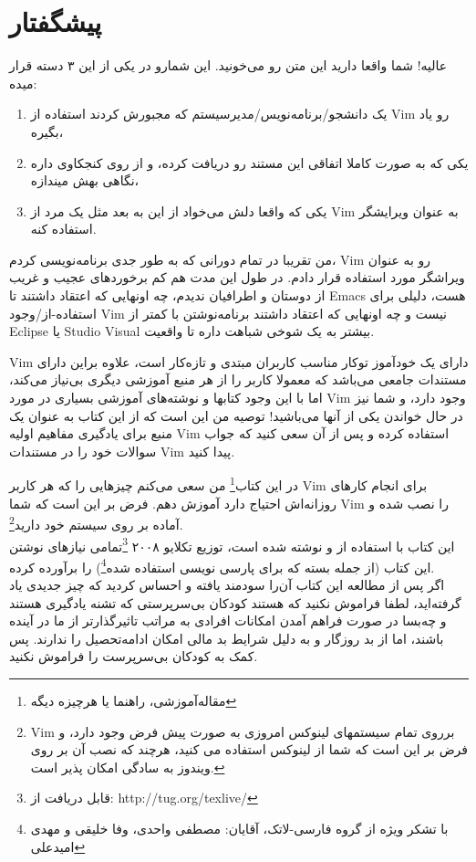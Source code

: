 \chapter{پیشگفتار}
عالیه! شما واقعا دارید این متن رو می‌خونید. این شمارو در یکی از این ۳ دسته قرار میده:
\begin{enumerate}
\item یک دانشجو/برنامه‌نویس/مدیرسیستم که مجبورش کردند استفاده از Vim رو یاد بگیره،
\item یکی که به صورت کاملا اتفاقی این مستند رو دریافت کرده،‌ و از روی کنجکاوی داره نگاهی بهش میندازه،
\item یکی که واقعا دلش می‌خواد از این به بعد مثل یک مرد از Vim به عنوان ویرایشگر استفاده کنه.
\end{enumerate}


من تقریبا در تمام دورانی که به طور جدی برنامه‌نویسی کردم، Vim رو به عنوان ویراشگر مورد استفاده قرار دادم. در طول این مدت هم کم برخوردهای عجیب و غریب از دوستان و اطرافیان ندیدم، چه اونهایی که اعتقاد داشتند تا Emacs هست، دلیلی برای استفاده-از/وجود Vim نیست و چه اونهایی که اعتقاد داشتند برنامه‌نوشتن با کمتر از Eclipse یا Studio Visual بیشتر به یک شوخی شباهت داره تا واقعیت.

Vim دارای یک خود‌آموز توکار  مناسب کاربران مبتدی و تازه‌کار است، علاوه براین دارای مستندات جامعی می‌باشد که معمولا کاربر را از هر منبع آموزشی دیگری بی‌نیاز می‌کند، اما با این وجود کتابها و نوشته‌های آموزشی بسیاری در مورد Vim وجود دارد، و شما نیز در حال خواندن یکی از آنها می‌باشید! توصیه من این است که از این کتاب به عنوان یک منبع برای یادگیری مفاهیم اولیه Vim استفاده کرده و پس از آن سعی کنید که جواب سوالات خود را در مستندات Vim پیدا کنید.

در این کتاب\footnote{مقاله‌آموزشی، راهنما یا هرچیزه دیگه} من سعی می‌کنم چیزهایی را که هر کاربر Vim برای انجام کارهای روزانه‌اش احتیاج دارد آموزش دهم. فرض بر این است که شما Vim را نصب شده و آماده بر روی سیستم خود دارید\footnote{Vim برروی تمام سیستمهای لینوکس امروزی به صورت پیش فرض وجود دارد، و فرض بر این است که شما از لینوکس استفاده می کنید، هرچند که نصب آن بر روی ویندوز به سادگی امکان پذیر است.}. \\

این کتاب با استفاده از \mbox{\lr{\TeX\\}} و \mbox{\lr{\XeTeX\\}} نوشته شده است، توزیع تکلایو ۲۰۰۸ \footnote{قابل دریافت از: http://tug.org/texlive/}تمامی نیازهای نوشتن این کتاب (از جمله بسته \mbox{\lr{\XePersian\\}} که برای پارسی نویسی استفاده شده\footnote{با تشکر ویژه از گروه فارسی-لاتک،‌ آقایان: مصطفی واحدی، وفا خلیقی و مهدی امیدعلی}) را برآورده کرده.\\
\newpage
{\sols اگر پس از مطالعه این کتاب آن‌را سودمند یافته و احساس کردید که چیز جدیدی یاد گرفته‌اید، لطفا فراموش نکنید که هستند کودکان بی‌سرپرستی که تشنه یادگیری هستند و چه‌بسا در صورت فراهم آمدن امکانات افرادی به مراتب تاثیرگذارتر از ما در آینده باشند، اما از بد روزگار و به دلیل شرایط بد مالی امکان ادامه‌تحصیل را ندارند. پس کمک به کودکان بی‌سرپرست را فراموش نکنید.}
